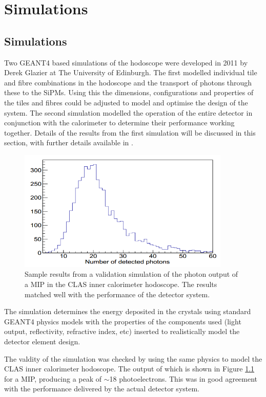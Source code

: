 \chapter{Simulations}

\section{Simulations}

Two GEANT4 based simulations of the hodoscope were developed in 2011 by Derek Glazier at The University of Edinburgh. The first modelled individual tile and fibre combinations in the hodoscope and the transport of photons through these to the SiPMs. Using this the dimensions, configurations and properties of the tiles and fibres could be adjusted to model and optimise the design of the system. The second simulation modelled the operation of the entire detector in conjunction with the calorimeter to determine their performance working together. Details of the results from the first simulation will be discussed in this section, with further details available in \cite{FTTDR2012}.

\begin{figure}
	\centering
	\includegraphics[width=0.9\textwidth]{ImgChap1/mip}
	\caption{Sample results from a validation simulation of the photon output of a MIP in the CLAS inner calorimeter hodoscope. The results matched well with the performance of the detector system. \cite{FTTDR2012} }
	\label{SimulationMIP}
\end{figure}

The simulation determines the energy deposited in the crystals using standard GEANT4 physics models with the properties of the components used (light output, reflectivity, refractive index, etc) inserted to realistically model the detector element design.

The valdity of the simulation was checked by using the same physics to model the CLAS inner calorimeter hodoscope. The output of which is shown in Figure \ref{SimulationMIP} for a MIP, producing a peak of $\sim$18 photoelectrons. This was in good agreement with the performance delivered by the actual detector system.


